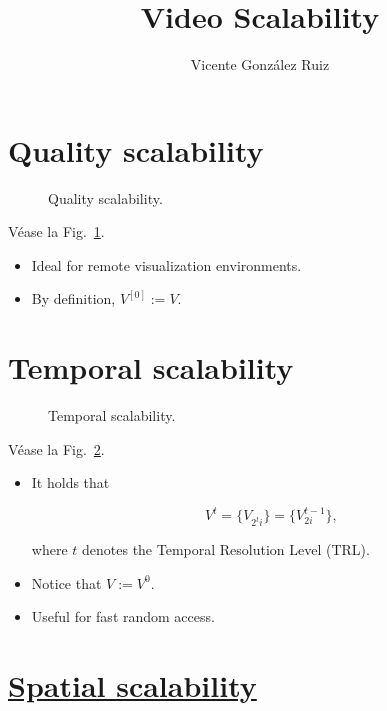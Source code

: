 \title{Video Scalability}
\author{Vicente González Ruiz}
\maketitle
\tableofcontents

\section{Quality scalability}

\begin{figure}
  \caption{Quality scalability.}
  \label{fig:quality-scalability}
\end{figure}

Véase la Fig.~\ref{fig:quality-scalability}.
\begin{itemize}
\item
  Ideal for remote visualization environments.
\item
  By definition, $V^{[0]}:=V$.
\end{itemize}

\section{Temporal scalability}
\begin{figure}
  \caption{Temporal scalability.}
  \label{fig:temporal-scalability}
\end{figure}

Véase la Fig.~\ref{fig:temporal-scalability}.

\begin{itemize}
\item
  It holds that

  \begin{equation}
    V^{t}=\{V_{2^t i}\}=\{V_{2i}^{t-1}\},
  \end{equation}

  where $t$ denotes the Temporal Resolution Level (TRL).
\item
  Notice that $V:=V^{0}$.
\item
  Useful for fast random access.
\end{itemize}

%
%

\section{\href{http://inst.eecs.berkeley.edu/~ee290t/sp04/lectures/videowavelet_UCB1-3.pdf}{Spatial scalability}}

